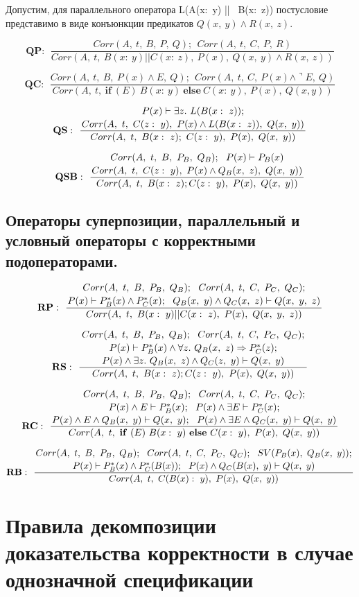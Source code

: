 \documentclass[10pt,a4paper]{article}
\newcommand{\ruleI}[3] {
$$
\mathbf{#1:} ~~
\frac{#2}{#3}
$$
}
\newcommand{\ruleII}[4] {
\ruleI{#1}
{\genfrac{}{}{0pt}{0}{#2}{#3}}
{#4}
}
\newcommand{\ruleIII}[5] {
\ruleII{#1}
{\genfrac{}{}{0pt}{0}{#2}{#3}}
{#4}
{#5}
}
\begin{document}
Допустим, для параллельного оператора L(A(x: y) ||  B(x: z)) постусловие представимо в виде конъюнкции предикатов $ Q(x,~y) \land R(x,~z) $.

\ruleI{QP}
{Corr(A,~t,~B,~P,~Q);~~Corr(A,~t,~C,~P,~R)}
{Corr(A,~t,~B(x:~y)||C(x:~z),~P(x),~Q(x,~y) \land R(x,~z))}

\ruleI{QC}
{Corr(A,~t,~B,~P(x) \land E,~Q);~~Corr(A,~t,~C,~P(x) \land \urcorner E,~Q)}
{Corr(A,~t, ~\mathbf{if}~(E)~B(x:~y)~\mathbf{else}~C(x:~y),~P(x),~Q(x, y))}

\ruleII{QS}
{P(x) \vdash \exists z.~L(B(x:~z));}
{Corr(A,~t,~C(z:~y),~P(x) \land L(B(x:~z)),~Q(x,~y))}
{Corr(A,~t,~B(x:~z);~C(z:~y),~P(x),~Q(x,~y))}

\ruleII{QSB}
{Corr(A,~t,~B,~P_B,~Q_B);~~P(x) \vdash P_B(x)}
{Corr(A,~t,~C(z:~y),~P(x) \land Q_B(x,~z),~Q(x,~y))}
{Corr(A,~t,~B(x:~z);C(z:~y),~P(x),~Q(x,~y))}

\subsection{Операторы суперпозиции, параллельный и условный операторы с корректными подоператорами.}

\ruleII{RP}
{Corr(A,~t,~B,~P_B,~Q_B);~~Corr(A,~t,~C,~P_C,~Q_C);}
{P(x) \vdash P^*_B(x) \land P^*_C(x);~~Q_B(x,~y) \land Q_C(x,~z) \vdash Q(x,~y,~z)}
{Corr(A,~t,~B(x:~y)||C(x:~z),~P(x),~Q(x,~y,~z))}

\ruleIII{RS}
{Corr(A,~t,~B,~P_B,~Q_B);~~Corr(A,~t,~C,~P_C,~Q_C);}
{P(x) \vdash P^*_B(x) \land \forall z.~Q_B(x,~z) \Rightarrow P^*_C(z);}
{P(x) \land \exists z.~Q_B(x,~z) \land Q_C(z,~y) \vdash Q(x,~y)}
{Corr(A,~t,~B(x:~z);C(z:~y),~P(x),~Q(x,~y))}

\ruleIII{RC}
{Corr(A,~t,~B,~P_B,~Q_B);~~Corr(A,~t,~C,~P_C,~Q_C);}
{P(x) \land E \vdash P^*_B(x);~~P(x) \land \exists E \vdash P^*_C(x);}
{P(x) \land E \land Q_B(x,~y)\vdash Q(x,~y);~~P(x) \land \exists E \land Q_C(x,~y) \vdash Q(x,~y)}
{Corr(A,~t,~\mathbf{if}~(E)~B(x:~y)~\mathbf{else}~C(x:~y),~P(x),~Q(x,~y))}

\ruleII{RB}
{Corr(A,~t,~B,~P_B,~Q_B);~~Corr(A,~t,~C,~P_C,~Q_C);~~SV(P_B(x),~Q_B(x,~y));}
{P(x) \vdash P^*_B(x) \land P^*_C(B(x));~~P(x) \land Q_C(B(x),~y) \vdash Q(x,~y)}
{Corr(A,~t,~C(B(x):~y),~P(x),~Q(x,~y))}

\section{Правила декомпозиции доказательства корректности в случае однозначной спецификации}
\end{document}
